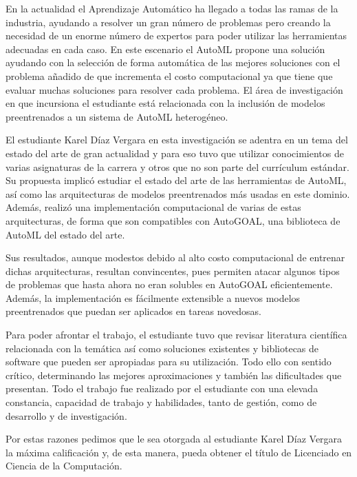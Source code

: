 \begin{opinion}
En la actualidad el Aprendizaje Automático ha llegado a todas las ramas de la industria, ayudando a resolver un gran número de problemas pero creando la necesidad de un enorme número de expertos para poder utilizar las herramientas adecuadas en cada caso.
En este escenario el AutoML propone una solución ayudando con la selección de forma automática de las mejores soluciones con el problema añadido de que incrementa el costo computacional ya que tiene que evaluar muchas soluciones para resolver cada problema. El área de investigación en que incursiona el estudiante está relacionada con la inclusión de modelos preentrenados a un sistema de AutoML heterogéneo.

El estudiante Karel Díaz Vergara en esta investigación se adentra en un tema del estado del arte de gran actualidad y para eso tuvo que utilizar conocimientos de varias asignaturas de la carrera y otros que no son parte del currículum estándar. Su propuesta implicó estudiar el estado del arte de las herramientas de AutoML, así como las arquitecturas de modelos preentrenados más usadas en este dominio. Además, realizó una implementación computacional de varias de estas arquitecturas, de forma que son compatibles con AutoGOAL, una biblioteca de AutoML del estado del arte.

Sus resultados, aunque modestos debido al alto costo computacional de entrenar dichas arquitecturas, resultan convincentes, pues permiten atacar algunos tipos de problemas que hasta ahora no eran solubles en AutoGOAL eficientemente. Además, la implementación es fácilmente extensible a nuevos modelos preentrenados que puedan ser aplicados en tareas novedosas.

Para poder afrontar el trabajo, el estudiante tuvo que revisar literatura científica relacionada con la temática así como soluciones existentes y bibliotecas de software que pueden ser apropiadas para su utilización. Todo ello con sentido crítico, determinando las mejores aproximaciones y también las dificultades que presentan. Todo el trabajo fue realizado por el estudiante con una elevada constancia, capacidad de trabajo y habilidades, tanto de gestión, como de desarrollo y de investigación.

Por estas razones pedimos que le sea otorgada al estudiante Karel Díaz Vergara la máxima calificación y, de esta manera, pueda obtener el título de Licenciado en Ciencia de la Computación.

\begingroup
  \centering
  \hspace{1cm}
  \par
\endgroup

\end{opinion}